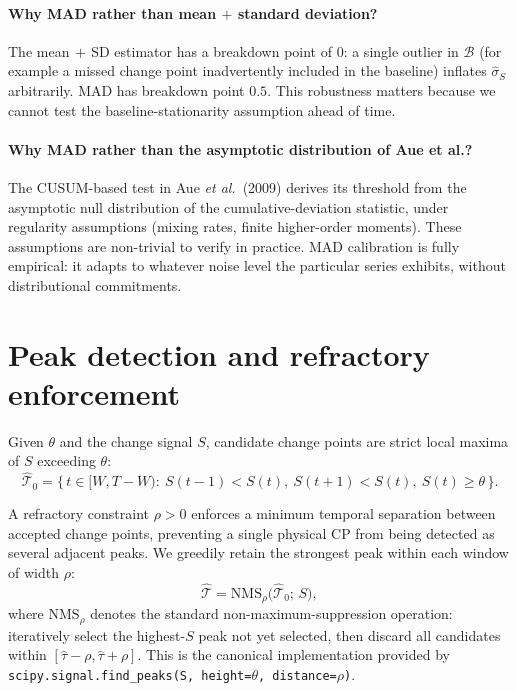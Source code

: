 \documentclass[11pt,a4paper]{article}
\begin{document}
\paragraph{Why MAD rather than mean$\,+\,$standard deviation?}
The mean$\,+\,$SD estimator has a breakdown point of $0$: a single outlier
in $\mathcal{B}$ (for example a missed change point inadvertently included in
the baseline) inflates $\hat\sigma_S$ arbitrarily. MAD has breakdown point
$0.5$. This robustness matters because we cannot test the
baseline-stationarity assumption ahead of time.

\paragraph{Why MAD rather than the asymptotic distribution of Aue et al.?}
The CUSUM-based test in Aue \emph{et al.}\ (2009) derives its threshold
from the asymptotic null distribution of the cumulative-deviation
statistic, under regularity assumptions (mixing rates, finite higher-order
moments). These assumptions are non-trivial to verify in practice. MAD
calibration is fully empirical: it adapts to whatever noise level the
particular series exhibits, without distributional commitments.

\section{Peak detection and refractory enforcement}

Given $\theta$ and the change signal $S$, candidate change points are
strict local maxima of $S$ exceeding $\theta$:
\begin{equation}
\widehat{\mathcal{T}}_0
= \big\{\,t \in [W, T-W) :\ S(t-1) < S(t),\ S(t+1) < S(t),\ S(t) \ge \theta\,\big\}.
\end{equation}

A refractory constraint $\rho > 0$ enforces a minimum temporal separation
between accepted change points, preventing a single physical CP from being
detected as several adjacent peaks. We greedily retain the strongest peak
within each window of width $\rho$:
\begin{equation}
\widehat{\mathcal{T}}
= \mathrm{NMS}_{\rho}\!\big(\widehat{\mathcal{T}}_0;\, S\big),
\end{equation}
where $\mathrm{NMS}_{\rho}$ denotes the standard non-maximum-suppression
operation: iteratively select the highest-$S$ peak not yet selected, then
discard all candidates within $[\hat\tau - \rho, \hat\tau + \rho]$.
This is the canonical implementation provided by
\texttt{scipy.signal.find\_peaks(S, height=$\theta$, distance=$\rho$)}.
\end{document}
